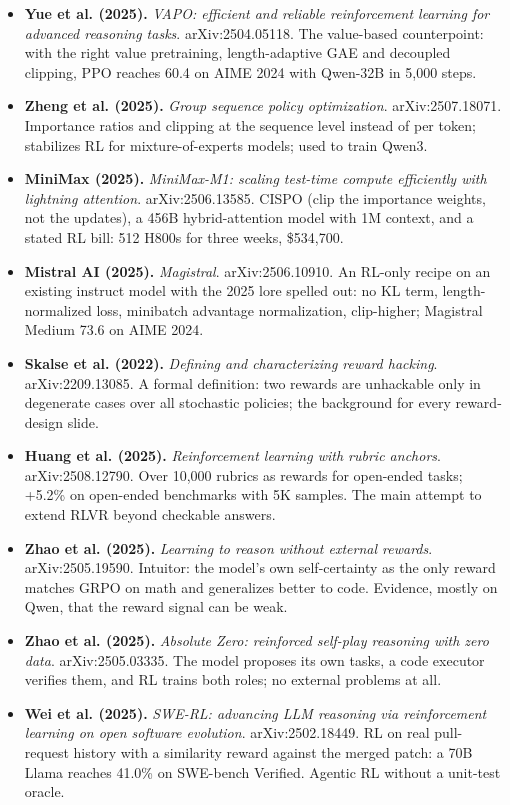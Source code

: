 \documentclass[11pt,letterpaper]{article}
\begin{document}
\begin{itemize}[leftmargin=1.2em,itemsep=3pt]
\item \textbf{Yue et al. (2025).} \textit{VAPO: efficient and reliable reinforcement learning for advanced reasoning tasks}. arXiv:2504.05118. The value-based counterpoint: with the right value pretraining, length-adaptive GAE and decoupled clipping, PPO reaches 60.4 on AIME 2024 with Qwen-32B in 5,000 steps.
\item \textbf{Zheng et al. (2025).} \textit{Group sequence policy optimization}. arXiv:2507.18071. Importance ratios and clipping at the sequence level instead of per token; stabilizes RL for mixture-of-experts models; used to train Qwen3.
\item \textbf{MiniMax (2025).} \textit{MiniMax-M1: scaling test-time compute efficiently with lightning attention}. arXiv:2506.13585. CISPO (clip the importance weights, not the updates), a 456B hybrid-attention model with 1M context, and a stated RL bill: 512 H800s for three weeks, \$534,700.
\item \textbf{Mistral AI (2025).} \textit{Magistral}. arXiv:2506.10910. An RL-only recipe on an existing instruct model with the 2025 lore spelled out: no KL term, length-normalized loss, minibatch advantage normalization, clip-higher; Magistral Medium 73.6 on AIME 2024.
\item \textbf{Skalse et al. (2022).} \textit{Defining and characterizing reward hacking}. arXiv:2209.13085. A formal definition: two rewards are unhackable only in degenerate cases over all stochastic policies; the background for every reward-design slide.
\item \textbf{Huang et al. (2025).} \textit{Reinforcement learning with rubric anchors}. arXiv:2508.12790. Over 10,000 rubrics as rewards for open-ended tasks; +5.2\% on open-ended benchmarks with 5K samples. The main attempt to extend RLVR beyond checkable answers.
\item \textbf{Zhao et al. (2025).} \textit{Learning to reason without external rewards}. arXiv:2505.19590. Intuitor: the model's own self-certainty as the only reward matches GRPO on math and generalizes better to code. Evidence, mostly on Qwen, that the reward signal can be weak.
\item \textbf{Zhao et al. (2025).} \textit{Absolute Zero: reinforced self-play reasoning with zero data}. arXiv:2505.03335. The model proposes its own tasks, a code executor verifies them, and RL trains both roles; no external problems at all.
\item \textbf{Wei et al. (2025).} \textit{SWE-RL: advancing LLM reasoning via reinforcement learning on open software evolution}. arXiv:2502.18449. RL on real pull-request history with a similarity reward against the merged patch: a 70B Llama reaches 41.0\% on SWE-bench Verified. Agentic RL without a unit-test oracle.

\end{itemize}
\end{document}
